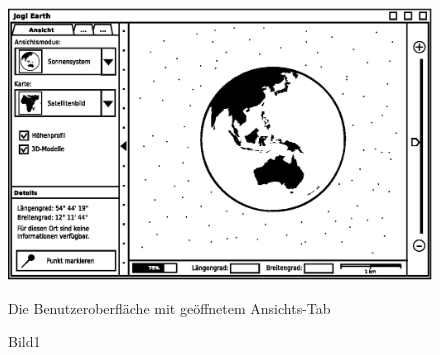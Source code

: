 \begin{figure}
	\centering
	\includegraphics[scale=0.9]{GUI-Ansicht.eps}
	\caption{Die Benutzeroberfläche mit geöffnetem Ansichts-Tab}
	\caption{Bild1}
	\label{Bild1}
\end{figure}
